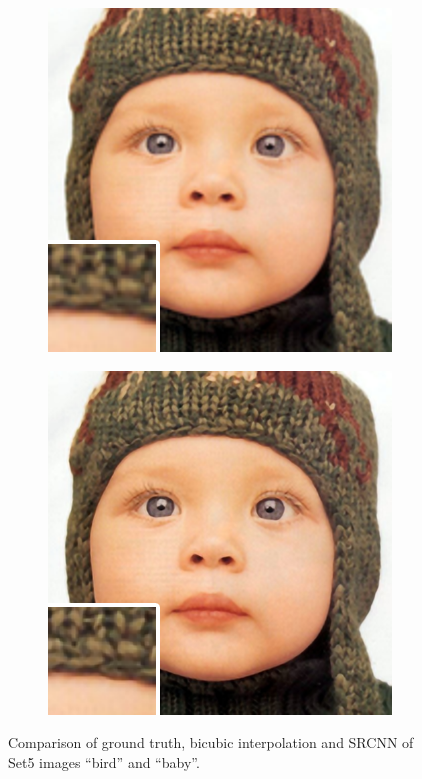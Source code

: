 \documentclass[
			fontsize = 12pt,
			paper = a4
			]
			{scrartcl}%
\newcommand{\?}{\ensuremath{^\texttt{\textbf [CITATION~NEEDED]}}}
\begin{document}
\begin{figure}[!ht]
\begin{subfigure}[b]{0.3\textwidth}
     \end{subfigure}
     \hfill
     \begin{subfigure}[b]{0.3\textwidth}
         \centering
         \includegraphics[width=\textwidth]{fig/examples/baby_bicubic_x3}
     \end{subfigure}
     \hfill
     \begin{subfigure}[b]{0.3\textwidth}
         \centering
         \includegraphics[width=\textwidth]{fig/examples/baby_srcnn_x3}
     \end{subfigure}
        \caption{Comparison of ground truth, bicubic interpolation and SRCNN of Set5 images \enquote{bird} and \enquote{baby}.}
        \label{fig:set5imagesII}
\end{figure}
\clearpage
\end{document}
